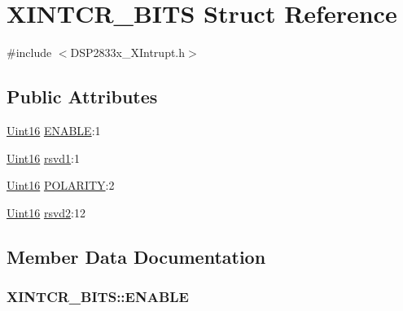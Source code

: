 \hypertarget{struct_x_i_n_t_c_r___b_i_t_s}{}\section{X\+I\+N\+T\+C\+R\+\_\+\+B\+I\+T\+S Struct Reference}
\label{struct_x_i_n_t_c_r___b_i_t_s}


{\ttfamily \#include $<$D\+S\+P2833x\+\_\+\+X\+Intrupt.\+h$>$}

\subsection*{Public Attributes}
\begin{DoxyCompactItemize}
\item 
\hyperlink{_d_s_p2833x___device_8h_a59a9f6be4562c327cbfb4f7e8e18f08b}{Uint16} \hyperlink{struct_x_i_n_t_c_r___b_i_t_s_a1e4efc3d35bf309773352bb2f2094e97}{E\+N\+A\+B\+L\+E}\+:1
\item 
\hyperlink{_d_s_p2833x___device_8h_a59a9f6be4562c327cbfb4f7e8e18f08b}{Uint16} \hyperlink{struct_x_i_n_t_c_r___b_i_t_s_a85870488d60516a6bd242b5e80971a6d}{rsvd1}\+:1
\item 
\hyperlink{_d_s_p2833x___device_8h_a59a9f6be4562c327cbfb4f7e8e18f08b}{Uint16} \hyperlink{struct_x_i_n_t_c_r___b_i_t_s_a0b683dacb511ed51c22ddaafa0dd12ee}{P\+O\+L\+A\+R\+I\+T\+Y}\+:2
\item 
\hyperlink{_d_s_p2833x___device_8h_a59a9f6be4562c327cbfb4f7e8e18f08b}{Uint16} \hyperlink{struct_x_i_n_t_c_r___b_i_t_s_a0373fa06b091a2850a355563eb567f93}{rsvd2}\+:12
\end{DoxyCompactItemize}


\subsection{Member Data Documentation}
\hypertarget{struct_x_i_n_t_c_r___b_i_t_s_a1e4efc3d35bf309773352bb2f2094e97}{}
\subsubsection[{E\+N\+A\+B\+L\+E}]{ X\+I\+N\+T\+C\+R\+\_\+\+B\+I\+T\+S\+::\+E\+N\+A\+B\+L\+E}\label{struct_x_i_n_t_c_r___b_i_t_s_a1e4efc3d35bf309773352bb2f2094e97}
\hypertarget{struct_x_i_n_t_c_r___b_i_t_s_a0b683dacb511ed51c22ddaafa0dd12ee}{}
